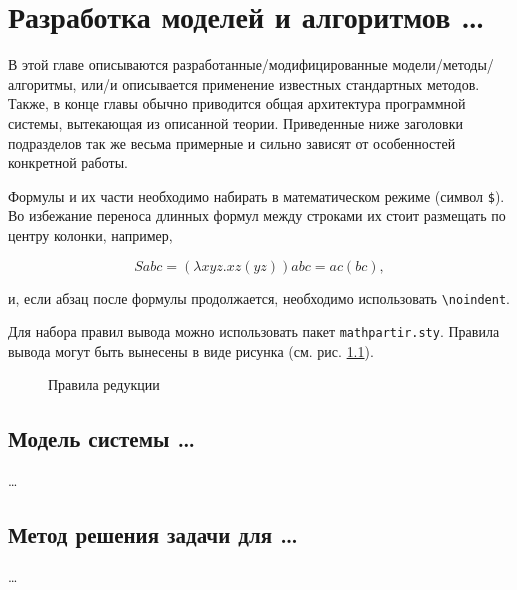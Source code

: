  \chapter{Разработка моделей и алгоритмов \dots}

В этой главе описываются разработанные/модифицированные модели/методы/
алгоритмы, или/и описывается применение известных стандартных методов. Также, 
в конце главы обычно приводится общая архитектура программной системы, 
вытекающая из описанной теории. Приведенные ниже заголовки подразделов так же 
весьма примерные и сильно зависят от особенностей конкретной работы.

Формулы и их части необходимо набирать в математическом режиме
(символ \verb|$|). Во избежание переноса длинных формул между строками их 
стоит размещать по центру колонки, например,

$$S a b c = (\lambda x y z. x z (y z)) a b c = a c (b c),$$

\noindent и, если абзац после формулы продолжается, необходимо использовать 
\verb|\noindent|.

Для набора правил вывода можно использовать пакет \texttt{mathpartir.sty}. 
Правила вывода могут быть вынесены в виде рисунка (см. рис. 
\ref{img:inferrules}).

\begin{figure}[t]
  \centering
  \caption{Правила редукции}
  \label{img:inferrules}
\end{figure}

\section{Модель системы \dots}

\dots




\section{Метод решения задачи для \dots}

\dots





